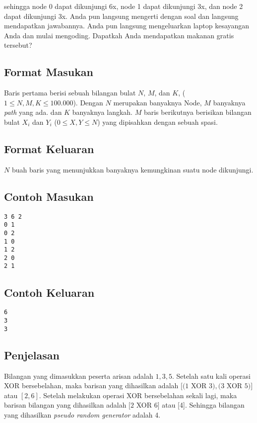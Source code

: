 \documentclass{article}
\begin{document}
sehingga node 0 dapat dikunjungi 6x, node 1 dapat dikunjungi 3x, dan node 2 dapat dikunjungi 3x. Anda pun langsung mengerti dengan soal dan langsung 
mendapatkan jawabannya. Anda pun langsung mengeluarkan laptop kesayangan Anda dan mulai mengoding. Dapatkah Anda mendapatkan makanan gratis tersebut?

\subsection*{Format Masukan}

Baris pertama berisi sebuah bilangan bulat $N$, $M$, dan $K$, ($1 \leq N,M,K \leq 100.000$). Dengan $N$ merupakan banyaknya Node, $M$ banyaknya \textit{path} yang ada.
dan $K$ banyaknya langkah.
$M$ baris berikutnya berisikan bilangan bulat $X_i$ dan $Y_i$ ($0 \leq X,Y \leq N$) yang dipisahkan dengan sebuah spasi.

\subsection*{Format Keluaran}

$N$ buah baris yang menunjukkan banyaknya kemungkinan suatu node dikunjungi.
\\

\begin{multicols}{2}
\subsection*{Contoh Masukan}
\begin{lstlisting}
3 6 2
0 1
0 2
1 0
1 2
2 0
2 1
\end{lstlisting}
\columnbreak
\subsection*{Contoh Keluaran}
\begin{lstlisting}
6
3
3
\end{lstlisting}
\vfill
\null
\end{multicols}

\subsection*{Penjelasan}
Bilangan yang dimasukkan peserta arisan adalah $1, 3, 5$. 
Setelah satu kali operasi XOR bersebelahan, maka barisan yang dihasilkan adalah $[(1$ XOR $3), (3$ XOR $5)]$ atau  $[2, 6]$. Setelah melakukan operasi XOR bersebelahan sekali lagi, maka barisan bilangan yang dihasilkan adalah $[2$ XOR $6]$ atau [4]. Sehingga bilangan yang dihasilkan \textit{pseudo random generator} adalah 4.


\pagebreak
\end{document}
